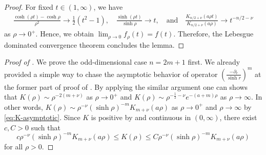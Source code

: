 \documentclass[11pt]{amsart}
\theoremstyle{plain}
\theoremstyle{definition}
\numberwithin{equation}{section}
\begin{document}
\begin{proof}
  For fixed $t \in (1, \infty)$, we have
  \begin{align*}
    \frac{\cosh(\rho t) - \cosh\rho}{\rho^2} \to \frac{1}{2}(t^2-1), \quad \frac{\sinh(\rho t)}{\sinh\rho} \to t, \quad \mbox{and} \quad \frac{K_{n/2 + \nu} (a\rho t)}{K_{n/2 + \nu} (a\rho)}  \to t^{-n/2 - \nu }
  \end{align*}
  as $\rho \to 0^{+}$. Hence, we obtain $\lim_{\rho \to 0} f_\rho(t) = f(t)$. Therefore, the Lebesgue dominated convergence theorem concludes the lemma. 
\end{proof}


\begin{proof}[Proof of ]
We prove the odd-dimensional case $n=2m+1$ first. We already provided a simple way to chase the asymptotic behavior of operator $\left ( \frac{-\partial_r}{\sinh r} \right )^m$ at the former part of proof of . By applying the similar argument one can shows that $K(\rho) \sim \rho^{-2(m+\nu)}$ as $\rho \to 0^+$ and $K(\rho) \sim \rho^{-\frac{1}{2}-\nu}e^{-(a+m)\rho}$ as $\rho \to \infty$. In other words, $K(\rho) \sim \rho^{-\nu} (\sinh\rho)^{-m} K_{m+\nu}(a\rho)$ as $\rho \to 0^+$ and $\rho \to \infty$ by \eqref{eq:K-asymptotic}. Since $K$ is positive by  and continuous in $(0, \infty)$, there exist $c, C>0$ such that
\begin{equation*}
    c\rho^{-\nu} (\sinh\rho)^{-m} K_{m+\nu}(a\rho) \leq K(\rho) \leq C\rho^{-\nu} (\sinh\rho)^{-m} K_{m+\nu}(a\rho)
\end{equation*}
for all $\rho >0$.


\end{proof}
\end{document}
